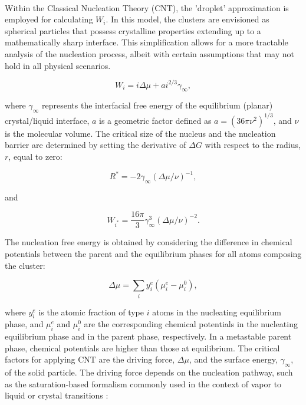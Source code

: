 \paragraph{} Within the Classical Nucleation Theory (CNT), the 'droplet' approximation is employed for calculating \(W_i\). In this model, the clusters are envisioned as spherical particles that possess crystalline properties extending up to a mathematically sharp interface. This simplification allows for a more tractable analysis of the nucleation process, albeit with certain assumptions that may not hold in all physical scenarios.

\begin{equation}
    W_i = i \Delta \mu + a i^{2/3}\gamma_{\infty},
\end{equation}

where \(\gamma_{\infty}\) represents the interfacial free energy of the equilibrium (planar) crystal/liquid interface, \(a\) is a geometric factor defined as \(a = (36 \pi \nu^2)^{1/3}\), and \(\nu\) is the molecular volume. The critical size of the nucleus and the nucleation barrier are determined by setting the derivative of \(\Delta G\) with respect to the radius, \(r\), equal to zero:

\begin{equation}
    R^* = -2\gamma_{\infty} (\Delta \mu / \nu)^{-1},
\end{equation}

and

\begin{equation}
    W_{i^*} = \frac{16 \pi}{3} \gamma_{\infty}^3(\Delta \mu / \nu)^{-2}.
\end{equation}

The nucleation free energy is obtained by considering the difference in chemical potentials between the parent and the equilibrium phases for all atoms composing the cluster:

\begin{equation}
    \Delta \mu = \sum_i y_i^e (\mu_i^e - \mu_i^0),
\end{equation}

where \(y_i^e\) is the atomic fraction of type \(i\) atoms in the nucleating equilibrium phase, and \(\mu_i^e\) and \(\mu_i^0\) are the corresponding chemical potentials in the nucleating equilibrium phase and in the parent phase, respectively. In a metastable parent phase, chemical potentials are higher than those at equilibrium. The critical factors for applying CNT are the driving force, \(\Delta \mu\), and the surface energy, \(\gamma_{\infty}\), of the solid particle. The driving force depends on the nucleation pathway, such as the saturation-based formalism commonly used in the context of vapor to liquid or crystal transitions \cite{Myerson2019, Ford2004, Sun2009}:

